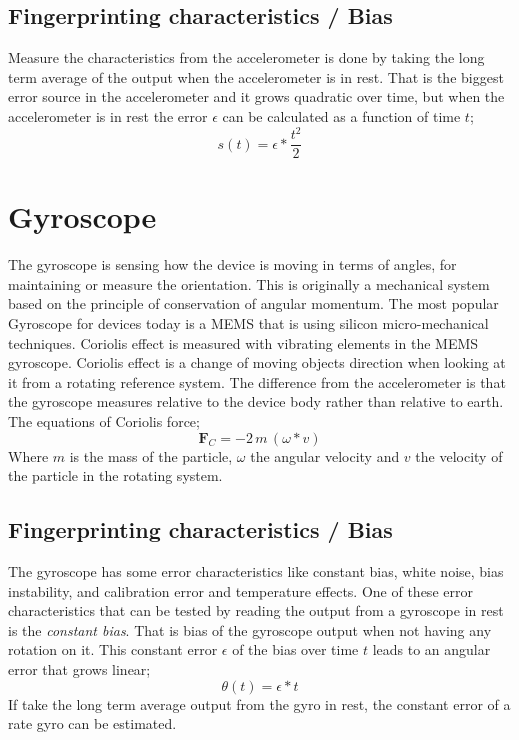 \subsection{Fingerprinting characteristics / Bias}
Measure the characteristics from the accelerometer is done by taking the long term average of the output when the accelerometer is in rest. That is the biggest error source in the accelerometer and it grows quadratic over time, but when the accelerometer is in rest the error $\epsilon$ can be calculated as a function of time $t$;
\begin{equation} \label{eq:AccBias}
s(t)=\epsilon * \frac{t^2}{2} 
\end{equation}
\cite[]{sensor:inertialNav}\cite[]{sensors:fusion}


\section{Gyroscope}\label{sec:gyroscope}
The gyroscope is sensing how the device is moving in terms of angles, for maintaining or measure the orientation. This is originally a mechanical system based on the principle of conservation of angular momentum. The most popular Gyroscope for devices today is a MEMS that is using silicon micro-mechanical techniques. Coriolis effect is measured with vibrating elements in the MEMS gyroscope. Coriolis effect is a change of moving objects direction when looking at it from a rotating reference system. The difference from the accelerometer is that the gyroscope measures relative to the device body rather than relative to earth. The equations of Coriolis force;  
$$\boldsymbol{ F}_C = -2 \, m \, (\omega *  v)$$
Where $m$ is the mass of the particle, $\omega$ the angular velocity and $v$ the velocity of the particle in the rotating system. 
\cite[]{sensor:inertialNav}
\subsection{Fingerprinting characteristics / Bias}
The gyroscope has some error characteristics like constant bias, white noise, bias instability, and calibration error and temperature effects. One of these error characteristics that can be tested by reading the output from a gyroscope in rest is the \textit{constant bias}. That is bias of the gyroscope output when not having any rotation on it. This constant error $\epsilon$ of the bias over time $t$ leads to an angular error that grows linear; 
\begin{equation} \label{eq:gyroBias}
\theta (t)= \epsilon * t
\end{equation}
If take the long term average output from the gyro in rest, the constant error of a rate gyro can be estimated.\cite[]{sensors:fusion}


